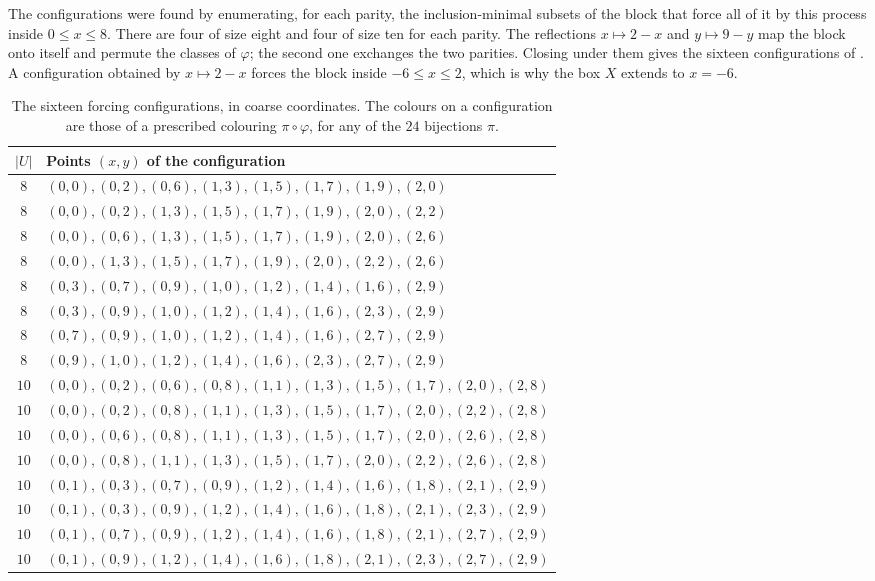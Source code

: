 \documentclass[11pt,colorlinks]{charlie}
\begin{document}
The configurations were found by enumerating, for each parity, the inclusion-minimal subsets of the block that force all of it by this process inside $0\le x\le8$. There are four of size eight and four of size ten for each parity. The reflections $x\mapsto2-x$ and $y\mapsto9-y$ map the block onto itself and permute the classes of $\varphi$; the second one exchanges the two parities. Closing under them gives the sixteen configurations of . A configuration obtained by $x\mapsto2-x$ forces the block inside $-6\le x\le2$, which is why the box $X$ extends to $x=-6$.

\begin{table}[ht]
\centering\small
\begin{tabular}{@{}cl@{}}
\toprule
$|U|$ & Points $(x,y)$ of the configuration\\
\midrule
$8$ & $(0,0),(0,2),(0,6),(1,3),(1,5),(1,7),(1,9),(2,0)$\\
$8$ & $(0,0),(0,2),(1,3),(1,5),(1,7),(1,9),(2,0),(2,2)$\\
$8$ & $(0,0),(0,6),(1,3),(1,5),(1,7),(1,9),(2,0),(2,6)$\\
$8$ & $(0,0),(1,3),(1,5),(1,7),(1,9),(2,0),(2,2),(2,6)$\\
$8$ & $(0,3),(0,7),(0,9),(1,0),(1,2),(1,4),(1,6),(2,9)$\\
$8$ & $(0,3),(0,9),(1,0),(1,2),(1,4),(1,6),(2,3),(2,9)$\\
$8$ & $(0,7),(0,9),(1,0),(1,2),(1,4),(1,6),(2,7),(2,9)$\\
$8$ & $(0,9),(1,0),(1,2),(1,4),(1,6),(2,3),(2,7),(2,9)$\\
$10$ & $(0,0),(0,2),(0,6),(0,8),(1,1),(1,3),(1,5),(1,7),(2,0),(2,8)$\\
$10$ & $(0,0),(0,2),(0,8),(1,1),(1,3),(1,5),(1,7),(2,0),(2,2),(2,8)$\\
$10$ & $(0,0),(0,6),(0,8),(1,1),(1,3),(1,5),(1,7),(2,0),(2,6),(2,8)$\\
$10$ & $(0,0),(0,8),(1,1),(1,3),(1,5),(1,7),(2,0),(2,2),(2,6),(2,8)$\\
$10$ & $(0,1),(0,3),(0,7),(0,9),(1,2),(1,4),(1,6),(1,8),(2,1),(2,9)$\\
$10$ & $(0,1),(0,3),(0,9),(1,2),(1,4),(1,6),(1,8),(2,1),(2,3),(2,9)$\\
$10$ & $(0,1),(0,7),(0,9),(1,2),(1,4),(1,6),(1,8),(2,1),(2,7),(2,9)$\\
$10$ & $(0,1),(0,9),(1,2),(1,4),(1,6),(1,8),(2,1),(2,3),(2,7),(2,9)$\\
\bottomrule
\end{tabular}
\caption{The sixteen forcing configurations, in coarse coordinates. The colours on a configuration are those of a prescribed colouring $\pi\circ\varphi$, for any of the $24$ bijections $\pi$.}
\label{tab:patterns}
\end{table}
\end{document}
